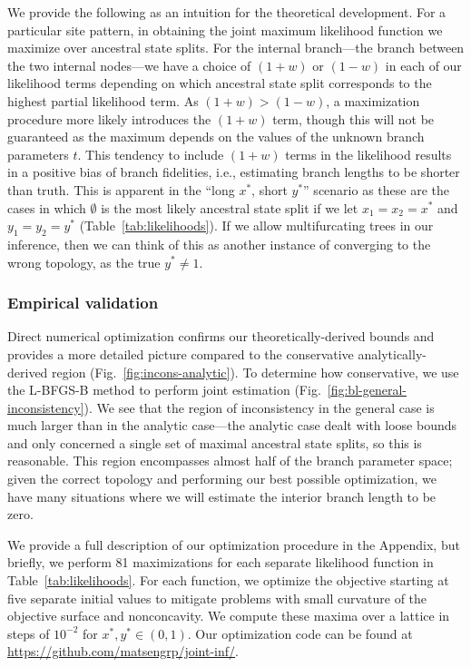 \documentclass[11pt]{article}
\begin{document}
We provide the following as an intuition for the theoretical development.
For a particular site pattern, in obtaining the joint maximum likelihood function we maximize over ancestral state splits.
For the internal branch---the branch between the two internal nodes---we have a choice of $(1+w)$ or $(1-w)$ in each of our likelihood terms depending on which ancestral state split corresponds to the highest partial likelihood term.
As $(1+w) > (1-w)$, a maximization procedure more likely introduces the $(1+w)$ term, though this will not be guaranteed as the maximum depends on the values of the unknown branch parameters $t$.
This tendency to include $(1+w)$ terms in the likelihood results in a positive bias of branch fidelities, i.e., estimating branch lengths to be shorter than truth.
This is apparent in the ``long $x^*$, short $y^*$'' scenario as these are the cases in which $\emptyset$ is the most likely ancestral state split if we let $x_1=x_2=x^*$ and $y_1=y_2=y^*$ (Table~\ref{tab:likelihoods}).
If we allow multifurcating trees in our inference, then we can think of this as another instance of converging to the wrong topology, as the true $y^*\neq 1$.

\subsubsection*{Empirical validation}

Direct numerical optimization confirms our theoretically-derived bounds and provides a more detailed picture compared to the conservative analytically-derived region (Fig.~\ref{fig:incons-analytic}).
To determine how conservative, we use the L-BFGS-B method to perform joint estimation (Fig.~\ref{fig:bl-general-inconsistency}).
We see that the region of inconsistency in the general case is much larger than in the analytic case---the analytic case dealt with loose bounds and only concerned a single set of maximal ancestral state splits, so this is reasonable.
This region encompasses almost half of the branch parameter space; given the correct topology and performing our best possible optimization, we have many situations where we will estimate the interior branch length to be zero.

We provide a full description of our optimization procedure in the Appendix, but briefly, we perform 81 maximizations for each separate likelihood function in Table~\ref{tab:likelihoods}.
For each function, we optimize the objective starting at five separate initial values to mitigate problems with small curvature of the objective surface and nonconcavity.
We compute these maxima over a lattice in steps of $10^{-2}$ for $x^*,y^*\in(0,1)$.
Our optimization code can be found at \url{https://github.com/matsengrp/joint-inf/}.
\end{document}
